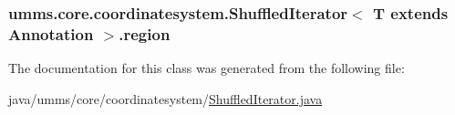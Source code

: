 \hypertarget{classumms_1_1core_1_1coordinatesystem_1_1_shuffled_iterator_3_01_t_01extends_01_annotation_01_4_aee6a816042a162c1eb807fdbc770b622}{
\subsubsection[{region}]{ umms.\+core.\+coordinatesystem.\+Shuffled\+Iterator$<$ T extends {\bf Annotation} $>$.region\hspace{0.3cm}{\ttfamily [protected]}}}\label{classumms_1_1core_1_1coordinatesystem_1_1_shuffled_iterator_3_01_t_01extends_01_annotation_01_4_aee6a816042a162c1eb807fdbc770b622}


The documentation for this class was generated from the following file\+:\begin{DoxyCompactItemize}
\item 
java/umms/core/coordinatesystem/\hyperlink{_shuffled_iterator_8java}{Shuffled\+Iterator.\+java}\end{DoxyCompactItemize}
